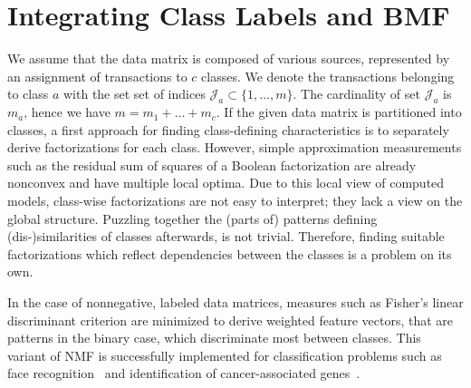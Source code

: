 \section{Integrating Class Labels and BMF}\label{sec:CS:IntegrateLabels}
We assume that the data matrix is composed of various sources, represented by an assignment of transactions to $c$ classes. 
We denote the transactions belonging to class $a$ with the set set of indices $\mathcal{J}_a\subset\{1,\ldots,m\}$. The cardinality of set $\mathcal{J}_a$ is $m_a$, hence we have $m=m_1+\ldots+m_c$.
If the given data matrix is partitioned into classes, a first approach for finding class-defining characteristics is to separately derive factorizations for each class. However, simple approximation measurements such as the residual sum of squares of a Boolean factorization are already nonconvex and have multiple local optima.
Due to this local view of computed models, class-wise factorizations are not easy to interpret; they lack a view on the global structure. Puzzling together the (parts of) patterns defining (dis-)similarities of classes afterwards, is not trivial. Therefore, finding suitable factorizations which reflect dependencies between the classes is a problem on its own.

In the case of nonnegative, labeled data matrices, measures such as Fisher's linear discriminant criterion are minimized to derive weighted feature vectors, that are patterns in the binary case, which discriminate most between classes. This variant of NMF is successfully implemented for classification problems such as face recognition~\citep{nikitidis2014projected} and identification of cancer-associated genes~\citep{odibat2014efficient}.

